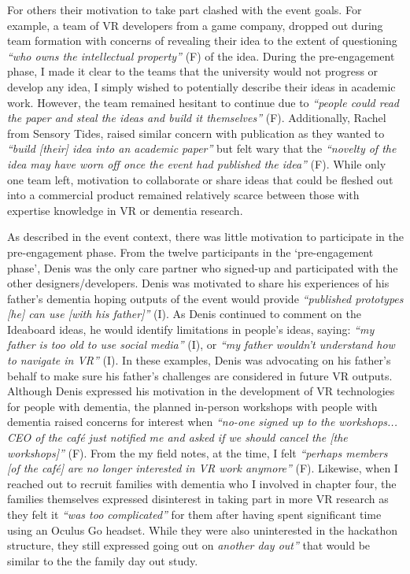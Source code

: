 For others their motivation to take part clashed with the event goals. For example, a team of VR developers from a game company, dropped out during team formation with concerns of revealing their idea to the extent of questioning \textit{``who owns the intellectual property''} (F) of the idea. During the pre-engagement phase, I made it clear to the teams that the university would not progress or develop any idea, I simply wished to potentially describe their ideas in academic work. However, the team remained hesitant to continue due to \textit{``people could read the paper and steal the ideas and build it themselves''} (F).  Additionally, Rachel from Sensory Tides, raised similar concern with publication as they wanted to \textit{``build [their] idea into an academic paper''} but felt wary that the \textit{``novelty of the idea may have worn off once the event had published the idea''} (F). While only one team left, motivation to collaborate or share ideas that could be fleshed out into a commercial product remained relatively scarce between those with expertise knowledge in VR or dementia research. 

As described in the event context, there was little motivation to participate in the pre-engagement phase. From the twelve participants in the `pre-engagement phase', Denis was the only care partner who signed-up and participated with the other designers/developers. Denis was motivated to share his experiences of his father’s dementia hoping outputs of the event would provide \textit{``published prototypes [he] can use [with his father]''} (I). As Denis continued to comment on the Ideaboard ideas, he would identify limitations in people’s ideas, saying: \textit{``my father is too old to use social media''} (I), or \textit{``my father wouldn’t understand how to navigate in VR''} (I). In these examples, Denis was advocating on his father's behalf to make sure his father’s challenges are considered in future VR outputs. Although Denis expressed his motivation in the development of VR technologies for people with dementia, the planned in-person workshops with people with dementia raised concerns for interest when \textit{``no-one signed up to the workshops... CEO of the café just notified me and asked if we should cancel the [the workshops]''} (F). From the my field notes, at the time, I felt \textit{``perhaps members [of the café] are no longer interested in VR work anymore''} (F). Likewise, when I reached out to recruit families with dementia who I involved in chapter four, the families themselves expressed disinterest in taking part in more VR research as they felt it \textit{``was too complicated''} for them after having spent significant time using an Oculus Go headset. While they were also uninterested in the hackathon structure, they still expressed going out on \textit{another day out''} that would be similar to the the family day out study.

